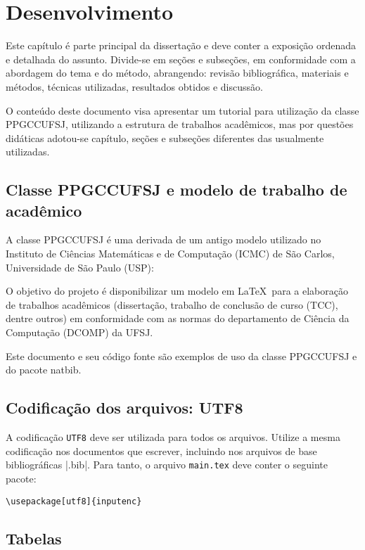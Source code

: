 \chapter{Desenvolvimento}\label{cap_exemplos}

Este capítulo é parte principal da dissertação e deve conter a exposição ordenada e detalhada do assunto. 
Divide-se em seções e subseções, 
em conformidade com a abordagem do tema e do método, abrangendo: 
revisão bibliográfica, materiais e métodos, técnicas utilizadas, resultados obtidos e discussão.

O conteúdo deste documento visa apresentar um tutorial para utilização da classe PPGCCUFSJ, utilizando a estrutura de trabalhos acadêmicos, 
mas por questões didáticas adotou-se capítulo, seções e subseções diferentes das usualmente utilizadas.

\section{Classe PPGCCUFSJ e modelo de trabalho de acadêmico}

A classe PPGCCUFSJ é uma derivada de um antigo modelo utilizado no Instituto de Ciências Matemáticas e de Computação (ICMC) de São Carlos, Universidade de São Paulo (USP):

O objetivo do projeto é disponibilizar um modelo em \LaTeX\  para a elaboração de trabalhos acadêmicos (dissertação, trabalho de conclusão de curso (TCC), dentre outros) em conformidade com as normas do departamento de Ciência da Computação (DCOMP) da UFSJ. 

Este documento e seu código fonte são exemplos de uso da classe PPGCCUFSJ e do pacote \textsf{natbib}.

\section{Codificação dos arquivos: UTF8}

A codificação \texttt{UTF8} deve ser utilizada para todos os arquivos. 
Utilize a mesma codificação nos documentos que escrever, 
incluindo nos arquivos de base bibliográficas |.bib|. 
Para tanto, o arquivo \texttt{main.tex} deve conter o seguinte pacote:
\begin{verbatim}
\usepackage[utf8]{inputenc}	 
\end{verbatim}

\section{Tabelas}

